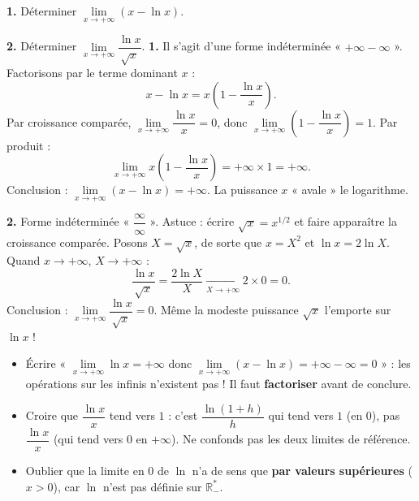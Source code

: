 \documentclass[11pt]{article}
\begin{document}
\begin{exoresolu}
\textbf{1.} Déterminer $\lim\limits_{x \to +\infty} (x - \ln x)$.

\textbf{2.} Déterminer $\lim\limits_{x \to +\infty} \dfrac{\ln x}{\sqrt{x}}$.
\tcblower
\textbf{1.} Il s'agit d'une forme indéterminée « $+\infty - \infty$ ». Factorisons par le terme dominant $x$ :
\[
x - \ln x = x\left(1 - \frac{\ln x}{x}\right).
\]
Par croissance comparée, $\lim\limits_{x \to +\infty} \dfrac{\ln x}{x} = 0$, donc $\lim\limits_{x \to +\infty} \left(1 - \dfrac{\ln x}{x}\right) = 1$. Par produit :
\[
\lim_{x \to +\infty} x\left(1 - \frac{\ln x}{x}\right) = +\infty \times 1 = +\infty.
\]
Conclusion : $\lim\limits_{x \to +\infty} (x - \ln x) = +\infty$. La puissance $x$ « avale » le logarithme.

\textbf{2.} Forme indéterminée « $\dfrac{\infty}{\infty}$ ». Astuce : écrire $\sqrt{x} = x^{1/2}$ et faire apparaître la croissance comparée. Posons $X = \sqrt{x}$, de sorte que $x = X^2$ et $\ln x = 2\ln X$. Quand $x \to +\infty$, $X \to +\infty$ :
\[
\frac{\ln x}{\sqrt{x}} = \frac{2\ln X}{X} \xrightarrow[X \to +\infty]{} 2 \times 0 = 0.
\]
Conclusion : $\lim\limits_{x \to +\infty} \dfrac{\ln x}{\sqrt{x}} = 0$. Même la modeste puissance $\sqrt{x}$ l'emporte sur $\ln x$ !
\end{exoresolu}

\begin{attention}
\begin{itemize}
\item Écrire « $\lim\limits_{x \to +\infty} \ln x = +\infty$ donc $\lim\limits_{x \to +\infty}(x - \ln x) = +\infty - \infty = 0$ » : les opérations sur les infinis n'existent pas ! Il faut \textbf{factoriser} avant de conclure.
\item Croire que $\dfrac{\ln x}{x}$ tend vers $1$ : c'est $\dfrac{\ln(1+h)}{h}$ qui tend vers $1$ (en $0$), pas $\dfrac{\ln x}{x}$ (qui tend vers $0$ en $+\infty$). Ne confonds pas les deux limites de référence.
\item Oublier que la limite en $0$ de $\ln$ n'a de sens que \textbf{par valeurs supérieures} ($x > 0$), car $\ln$ n'est pas définie sur $\mathbb{R}_-^*$.
\end{itemize}
\end{attention}
\end{document}
